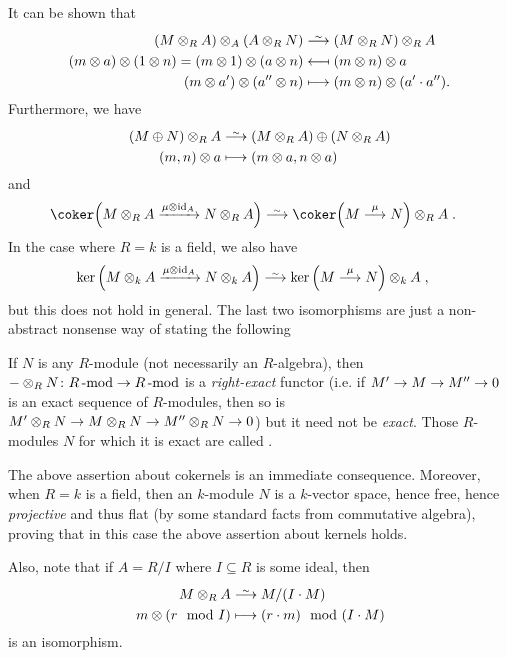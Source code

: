 \documentclass[a4paper,parskip=half,numbers=enddot, DIV=12]{scrreprt}
\begin{document}
It can be shown that
\begin{align*}
    (M\otimes_R A)\otimes_A(A\otimes_R N)&\isomorphism (M\otimes_R N) \otimes_R A\\
    (m\otimes a)\otimes(1\otimes n) = (m\otimes 1)\otimes(a\otimes n) &\longmapsfrom (m\otimes n)\otimes a\\
    (m\otimes a')\otimes(a''\otimes n) &\longmapsto (m\otimes n)\otimes(a'\cdot a'').
\end{align*}
Furthermore, we have
\begin{align*}
    (M\oplus N) \otimes_R A &\isomorphism (M\otimes_R A)\oplus(N\otimes_R A)\\
    (m,n)\otimes a &\longmapsto (m\otimes a, n\otimes a)
\end{align*}
and 
\begin{align*}
    \coker\Big(M\otimes_R A\xrightarrow{\mu\otimes \id_A} N\otimes_R A\Big) &\isomorphism \coker\Big(M\morphism[\mu] N\Big)\otimes_R A\;.
\end{align*}
In the case where $R=k$ is a field, we also have 
\begin{align*}
    \ker\Big(M\otimes_kA \xrightarrow{\mu\otimes \id_A} N\otimes_k A\Big) &\isomorphism \ker\left(M\morphism[\mu] N \right)\otimes_k A\;,
\end{align*}
but this does not hold in general. The last two isomorphisms are just a non-abstract nonsense way of stating the following
\begin{fact}
	If $N$ is any $R$-module (not necessarily an $R$-algebra), then $-\otimes_RN\colon R\cat{-mod}\morphism R\cat{-mod}$ is a \emph{right-exact} functor (i.e. if $M'\morphism M\morphism M''\morphism0$ is an exact sequence of $R$-modules, then so is $M'\otimes_RN\morphism M\otimes_RN\morphism M''\otimes_RN\morphism 0$) but it need not be \emph{exact}. Those $R$-modules $N$ for which it is exact are called .
\end{fact}
The above assertion about cokernels is an immediate consequence. Moreover, when $R=k$ is a field, then an $k$-module $N$ is a $k$-vector space, hence free, hence \emph{projective} and thus flat (by some standard facts from commutative algebra), proving that in this case the above assertion about kernels holds.

\begin{fact}
	Also, note that if $A=R/I$ where $I\subseteq R$ is some ideal, then 
	\begin{align*}
		M\otimes_R A &\isomorphism M/(I\cdot M)\\
		m\otimes(r\mod I) &\longmapsto (r\cdot m) \mod (I\cdot M)
	\end{align*}
	is an isomorphism.
\end{fact}
\end{document}
